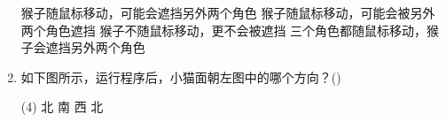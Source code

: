 \documentclass[10pt, a4paper]{article}
\newcommand{\hq}{\hfill(\qquad)}
\begin{document}
\begin{enumerate}
\begin{minipage}{.1\textwidth}
        \end{minipage}
        \begin{minipage}{.63\textwidth}
            \begin{tasks}
                \task 猴子随鼠标移动，可能会遮挡另外两个角色
                \task 猴子随鼠标移动，可能会被另外两个角色遮挡
                \task 猴子不随鼠标移动，更不会被遮挡
                \task 三个角色都随鼠标移动，猴子会遮挡另外两个角色
            \end{tasks}
        \end{minipage}

        \item 如下图所示，运行程序后，小猫面朝左图中的哪个方向？\hq
        \begin{tasks}(4)
            \task 北
            \task 南
            \task 西
            \task 北
        \end{tasks}


\end{enumerate}
\end{document}
